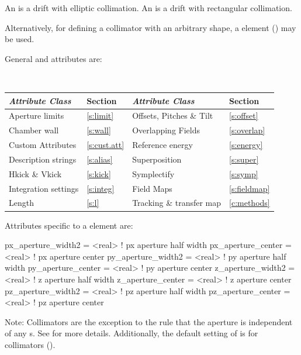 An  is a drift with elliptic collimation. An  is a drift
with rectangular collimation.

Alternatively, for defining a collimator with an arbitrary shape, a  element
() may be used.

General  and  attributes are:
\begin{center}
\tt
\begin{tabular}{llll} \toprule
  {\sl Attribute Class}      & Section          & {\sl Attribute Class}      & Section          \\ \midrule
  Aperture limits            & \ref{s:limit}    & Offsets, Pitches \& Tilt   & \ref{s:offset}   \\
  Chamber wall               & \ref{s:wall}     & Overlapping Fields         & \ref{s:overlap}  \\
  Custom Attributes          & \ref{s:cust.att} & Reference energy           & \ref{s:energy}   \\
  Description strings        & \ref{s:alias}    & Superposition              & \ref{s:super}    \\
  Hkick \& Vkick             & \ref{s:kick}     & Symplectify                & \ref{s:symp}     \\
  Integration settings       & \ref{s:integ}    & Field Maps                 & \ref{s:fieldmap} \\
  Length                     & \ref{s:l}        & Tracking \& transfer map   & \ref{c:methods}  \\
  \bottomrule
\end{tabular}
\end{center}
\toffset

Attributes specific to a  element are:
\begin{example}
  px_aperture_width2 = <real>  ! px aperture half width
  px_aperture_center = <real>  ! px aperture center
  py_aperture_width2 = <real>  ! py aperture half width
  py_aperture_center = <real>  ! py aperture center
  z_aperture_width2  = <real>  ! z aperture half width
  z_aperture_center  = <real>  ! z aperture center
  pz_aperture_width2 = <real>  ! pz aperture half width
  pz_aperture_center = <real>  ! pz aperture center
\end{example}

Note: Collimators are the exception to the rule that the aperture is independent of any s.
See  for more details. Additionally, the default setting of 
is  for collimators ().

